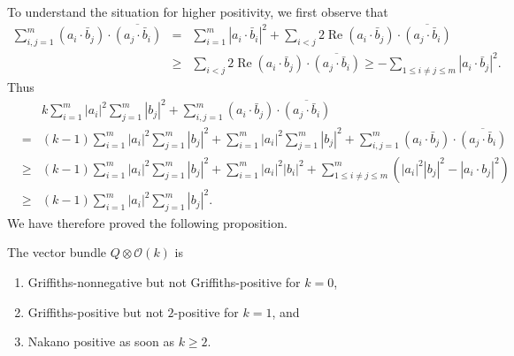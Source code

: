 \documentclass[12pt,hidelinks]{amsart}
\newcommand{\cO}{{\mathcal O}}
\renewcommand{\Re}{\operatorname{Re}}
\newcommand{\re}{\Re}
\newcommand{\tensor}{\otimes}
\begin{document}
To understand the situation for higher positivity, we first observe that 
\begin{eqnarray*}
\sum _{i,j=1} ^m (a_i \cdot \bar b _j) \cdot \overline{(a_j \cdot \bar b_i)} &=& \sum _{i=1} ^m |a_i \cdot \bar b_i|^2 + \sum _{i < j} 2 \re (a_i \cdot \bar b _j) \cdot \overline{(a_j \cdot \bar b_i)}\\
&\ge & \sum _{i < j} 2 \re (a_i \cdot \bar b _j) \cdot \overline{(a_j \cdot \bar b_i)} \ge   - \sum _{1 \le i \neq j \le m} |a_i \cdot \bar b_j|^2.
\end{eqnarray*}
Thus 
\begin{eqnarray*}
&& k \sum _{i=1} ^m |a_i|^2 \sum _{j=1} ^m |b_j|^2 + \sum _{i,j=1} ^m (a_i \cdot \bar b _j) \cdot \overline{(a_j \cdot \bar b_i)} \\
& = & (k-1) \sum _{i=1} ^m |a_i|^2 \sum _{j=1} ^m |b_j|^2 +  \sum _{i=1} ^m |a_i|^2 \sum _{j=1} ^m |b_j|^2 + \sum _{i,j=1} ^m (a_i \cdot \bar b _j) \cdot \overline{(a_j \cdot \bar b_i)}\\
& \ge & (k-1) \sum _{i=1} ^m |a_i|^2 \sum _{j=1} ^m |b_j|^2 +  \sum _{i=1} ^m |a_i|^2 |b_i|^2 +  \sum _{1 \le i\neq j \le m} ^m \left (|a_i|^2 |b_j|^2 - |a_i \cdot b_j|^2 \right )\\
&\ge& (k-1) \sum _{i=1} ^m |a_i|^2 \sum _{j=1} ^m |b_j|^2.
\end{eqnarray*}
We have therefore proved the following proposition.

\begin{prop}\label{Q(k)-pos-prop}
The vector bundle $Q \tensor \cO (k)$ is 
\begin{enumerate}[{\rm (i)}]
\item Griffiths-nonnegative but not Griffiths-positive for $k =0$, 
\item Griffiths-positive but not $2$-positive for $k=1$, and 
\item Nakano positive as soon as $k \ge 2$.
\end{enumerate}
\end{prop}
\end{document}
